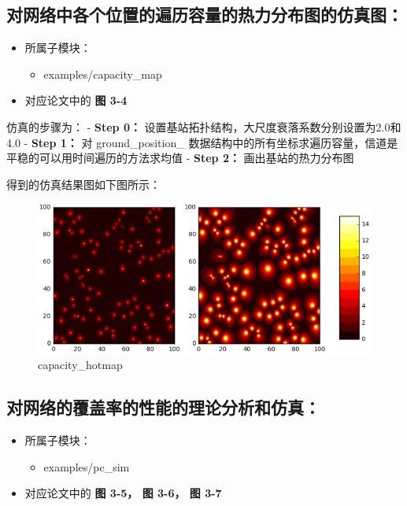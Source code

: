 \documentclass[11pt]{article}
\makeatletter
\def\maxwidth{\ifdim\Gin@nat@width>\linewidth\linewidth
    \else\Gin@nat@width\fi}
\let\Oldincludegraphics\includegraphics
\renewcommand{\includegraphics}[1]{\Oldincludegraphics[width=.8\maxwidth]{#1}}
\providecommand{\tightlist}{%
      \setlength{\itemsep}{0pt}\setlength{\parskip}{0pt}}
\makeatother
\begin{document}
    \subsection{对网络中各个位置的遍历容量的热力分布图的仿真图：}\label{ux5bf9ux7f51ux7edcux4e2dux5404ux4e2aux4f4dux7f6eux7684ux904dux5386ux5bb9ux91cfux7684ux70edux529bux5206ux5e03ux56feux7684ux4effux771fux56fe}

\begin{itemize}
\tightlist
\item
  所属子模块：

  \begin{itemize}
  \tightlist
  \item
    examples/capacity\_map
  \end{itemize}
\item
  对应论文中的 \textbf{图 3-4}
\end{itemize}

仿真的步骤为： - \textbf{Step 0：}
设置基站拓扑结构，大尺度衰落系数分别设置为2.0和4.0 - \textbf{Step 1：}
对 ground\_position\_
数据结构中的所有坐标求遍历容量，信道是平稳的可以用时间遍历的方法求均值 -
\textbf{Step 2：} 画出基站的热力分布图

得到的仿真结果图如下图所示：

\begin{figure}[htbp]
\centering
\includegraphics{capacity_hotmap.png}
\caption{capacity\_hotmap}
\end{figure}

    \subsection{对网络的覆盖率的性能的理论分析和仿真：}\label{ux5bf9ux7f51ux7edcux7684ux8986ux76d6ux7387ux7684ux6027ux80fdux7684ux7406ux8bbaux5206ux6790ux548cux4effux771f}

\begin{itemize}
\tightlist
\item
  所属子模块：

  \begin{itemize}
  \tightlist
  \item
    examples/pc\_sim
  \end{itemize}
\item
  对应论文中的 \textbf{图 3-5， 图 3-6， 图 3-7}
\end{itemize}
\end{document}
